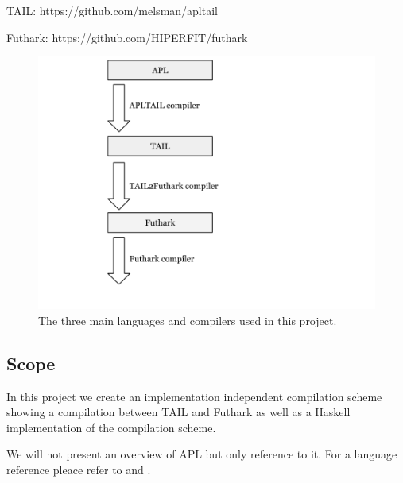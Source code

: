 \documentclass[11pt]{article}
\begin{document}
TAIL: https://github.com/melsman/apltail

Futhark: https://github.com/HIPERFIT/futhark


\begin{figure}
\label{fig:compilers}
\begin{center}
    \includegraphics[width=12cm]{compilers.png}
    \caption{The three main languages and compilers used in this project.}
\end{center}
\end{figure}


\subsection{Scope}
In this project we create an implementation independent compilation scheme showing a compilation between TAIL and Futhark as well as a Haskell implementation of the compilation scheme. 

We will not present an overview of APL but only reference to it. For a language reference pleace refer to \cite{APLbook} and \cite{APLDyalog}.
\end{document}
